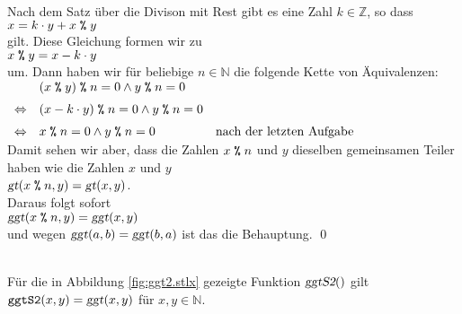 \proof
Nach dem Satz über die Divison mit Rest gibt es eine Zahl $k \in \mathbb{Z}$, so dass
\\[0.2cm]
\hspace*{1.3cm}
$x = k \cdot y + x \;\texttt{\%}\; y$
\\[0.2cm]
gilt.  Diese Gleichung formen wir zu
\\[0.2cm]
\hspace*{1.3cm}
$x \;\texttt{\%}\; y = x - k \cdot y$
\\[0.2cm]
um.  Dann haben wir für beliebige $n \in \mathbb{N}$ die folgende Kette von Äquivalenzen:
\\[0.2cm]
\hspace*{1.3cm}
$
\begin{array}[t]{lll}
                & (x \;\texttt{\%}\; y)   \;\texttt{\%}\; n = 0 \wedge y \;\texttt{\%}\; n = 0   \\[0.2cm]
\Leftrightarrow & (x - k \cdot y) \;\texttt{\%}\; n = 0 \wedge y \;\texttt{\%}\; n = 0   \\[0.2cm]
\Leftrightarrow & x \;\texttt{\%}\; n = 0 \wedge y \;\texttt{\%}\; n = 0               &
                  \mbox{nach der letzten Aufgabe}                        
\end{array}
$
\\[0.2cm]
Damit sehen wir aber, dass die Zahlen $x \;\texttt{\%}\; n$ und $y$ dieselben gemeinsamen Teiler haben wie
die Zahlen $x$ und $y$
\\[0.2cm]
\hspace*{1.3cm}
$\textsl{gt}(x \;\texttt{\%}\; n, y) = \textsl{gt}(x,y)$.
\\[0.2cm]
Daraus folgt sofort
\\[0.2cm]
\hspace*{1.3cm}
$\textsl{ggt}(x \;\texttt{\%}\; n, y) = \textsl{ggt}(x,y)$
\\[0.2cm]
und wegen $\textsl{ggt}(a,b) = \textsl{ggt}(b,a)$ ist das die Behauptung. \qed

\begin{Satz} \hspace*{\fill} \\
Für die in Abbildung \ref{fig:ggt2.stlx} gezeigte Funktion $\textsl{ggtS2}()$ gilt
\\[0.2cm]
\hspace*{1.3cm}
$\texttt{ggtS2}(x,y) = \textsl{ggt}(x,y)$ \quad für $x,y \in \mathbb{N}$.
\end{Satz}

